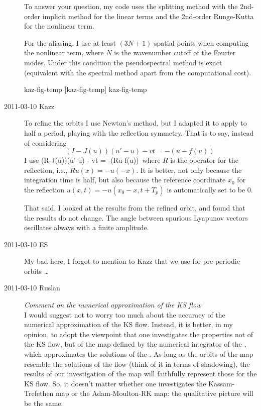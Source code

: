 \begin{description}
To answer your question, my code uses the splitting method with the
2nd-order implicit method
for the linear terms and the 2nd-order Runge-Kutta
for the nonlinear term.

For the aliasing, I use at least $(3N+1)$ spatial points when computing
the nonlinear term, where $N$ is the wavenumber cutoff of the Fourier modes.
Under this condition the pseudospectral method is exact
(equivalent with the spectral method apart from the computational cost).

{kaz-fig-temp}   %
{}   %
{    %
{\po}  [kaz-fig-temp]
}
{kaz-fig-temp}   %

\item[2011-03-10 Kazz] To refine the orbits I use Newton's method,
but I adapted it to apply to half a period, playing with the reflection
symmetry. That is to say, instead of considering
\[
  (I-J(u))(u'-u) - vt = -(u-f(u))\,
\]
I use
\beq
  (R-J(u))(u'-u) - vt = -(Ru-f(u))\,
 where $R$ is the operator
for the reflection, i.e., $Ru(x) = -u(-x)$.
It is better, not only because the integration time is half, but also because
the reference coordinate $x_0$ for the reflection $u(x,t)=-u(x_0-x,t+T_p)$
is automatically set to be 0.

That said, I looked at the results from the refined orbit, and found
that the results do not change. The angle between spurious Lyapunov vectors oscillates
always with a finite amplitude.

\item[2011-03-10 ES] My bad here, I forgot to mention to Kazz that we
use  for pre-periodic orbits \ldots

\item[2011-03-10 Ruslan] {\em Comment on the numerical approximation of the KS flow}\\
I would suggest not to worry too much about the accuracy of the numerical
approximation of the KS flow.  Instead, it is better, in my opinion, to
adopt the viewpoint that one investigates the properties not of the KS
flow, but of the map defined by the numerical integrator of the \KSe,
which approximates the solutions of the \KSe.  As long as the orbits of
the map resemble the solutions of the flow (think of it in terms of
shadowing), the results of our investigation of the map will faithfully
represent those for the KS flow.  So, it doesn't matter whether one
investigates the Kassam-Trefethen map or the Adam-Moulton-RK map: the
qualitative picture will be the same.


\end{description}
